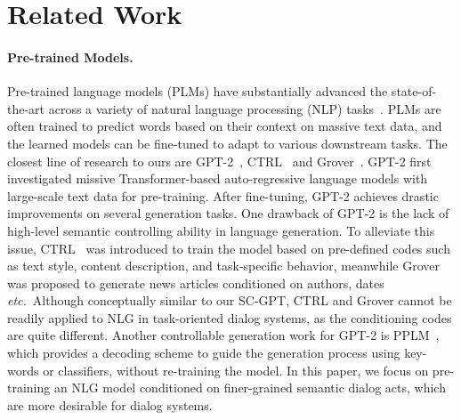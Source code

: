 \documentclass[11pt,a4paper]{article}
\newcommand{\etc}[0]{\emph{etc.}}
\begin{document}
\section{Related Work}







\paragraph{Pre-trained Models.} 
Pre-trained language models (PLMs) have substantially advanced the state-of-the-art across a variety of natural language processing (NLP) tasks~\cite{peters2018deep,devlin2019bert,yang2019xlnet,liu2019roberta,keskar2019ctrl,raffel2019exploring}. PLMs are often trained to predict words based on their context on massive text data, and the learned models can be fine-tuned to adapt to various downstream tasks.
The closest line of research to ours are GPT-2~\cite{gpt2}, CTRL~\cite{keskar2019ctrl} and Grover~\cite{zellers2019defending}. GPT-2 first investigated missive Transformer-based auto-regressive language models with large-scale text data for pre-training. After fine-tuning, GPT-2 achieves drastic improvements on several generation tasks. One drawback of GPT-2 is the lack of high-level semantic controlling ability in language generation.
To alleviate this issue, CTRL~\citep{keskar2019ctrl} was introduced to train the model based on pre-defined codes such as text style, content description, and task-specific behavior, meanwhile Grover~\cite{zellers2019defending} was proposed to generate news articles conditioned on authors, dates \etc ~Although conceptually similar to our SC-GPT, CTRL and Grover cannot be readily applied to NLG in task-oriented dialog systems, as the conditioning codes are quite different. Another controllable generation work for GPT-2 is PPLM~\citep{dathathri2019plug}, which provides a decoding scheme to guide the generation process using key-words or classifiers, without re-training the model. 
In this paper, we focus on pre-training an NLG model conditioned on finer-grained semantic dialog acts, which are more desirable for dialog systems.
\end{document}
